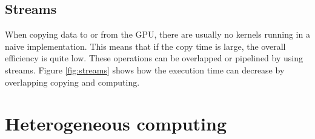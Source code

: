 \documentclass[../main/thesis.tex]{subfiles}
\begin{document}


\subsection{Streams}
When copying data to or from the GPU, there are usually no kernels running in a naive implementation.
This means that if the copy time is large, the overall efficiency is quite low.
These operations can be overlapped or pipelined by using streams. Figure \ref{fig:streams} shows how the execution time can decrease by overlapping copying and computing.






\section{Heterogeneous computing}
\end{document}
